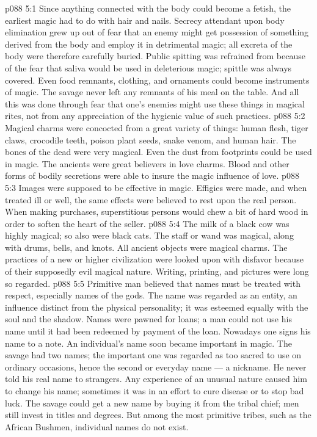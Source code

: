 \vs p088 5:1 Since anything connected with the body could become a fetish, the earliest magic had to do with hair and nails. Secrecy attendant upon body elimination grew up out of fear that an enemy might get possession of something derived from the body and employ it in detrimental magic; all excreta of the body were therefore carefully buried. Public spitting was refrained from because of the fear that saliva would be used in deleterious magic; spittle was always covered. Even food remnants, clothing, and ornaments could become instruments of magic. The savage never left any remnants of his meal on the table. And all this was done through fear that one’s enemies might use these things in magical rites, not from any appreciation of the hygienic value of such practices.
\vs p088 5:2 Magical charms were concocted from a great variety of things: human flesh, tiger claws, crocodile teeth, poison plant seeds, snake venom, and human hair. The bones of the dead were very magical. Even the dust from footprints could be used in magic. The ancients were great believers in love charms. Blood and other forms of bodily secretions were able to insure the magic influence of love.
\vs p088 5:3 Images were supposed to be effective in magic. Effigies were made, and when treated ill or well, the same effects were believed to rest upon the real person. When making purchases, superstitious persons would chew a bit of hard wood in order to soften the heart of the seller.
\vs p088 5:4 The milk of a black cow was highly magical; so also were black cats. The staff or wand was magical, along with drums, bells, and knots. All ancient objects were magical charms. The practices of a new or higher civilization were looked upon with disfavor because of their supposedly evil magical nature. Writing, printing, and pictures were long so regarded.
\vs p088 5:5 Primitive man believed that names must be treated with respect, especially names of the gods. The name was regarded as an entity, an influence distinct from the physical personality; it was esteemed equally with the soul and the shadow. Names were pawned for loans; a man could not use his name until it had been redeemed by payment of the loan. Nowadays one signs his name to a note. An individual’s name soon became important in magic. The savage had two names; the important one was regarded as too sacred to use on ordinary occasions, hence the second or everyday name --- a nickname. He never told his real name to strangers. Any experience of an unusual nature caused him to change his name; sometimes it was in an effort to cure disease or to stop bad luck. The savage could get a new name by buying it from the tribal chief; men still invest in titles and degrees. But among the most primitive tribes, such as the African Bushmen, individual names do not exist.

